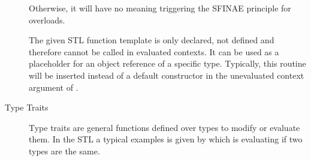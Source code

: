 \documentclass{stdlocal}
\begin{document}
\begin{description}
        Otherwise, it will have no meaning triggering the SFINAE principle for overloads.
      \item[\text{\code{std::declval}}]
        The given STL function template is only declared, not defined and therefore cannot be called in evaluated contexts.
        It can be used as a placeholder for an object reference of a specific type.
        Typically, this routine will be inserted instead of a default constructor in the unevaluated context argument of .
      \item[Type Traits]
        Type traits are general functions defined over types to modify or evaluate them.
        In the STL a typical examples is given by  which is evaluating if two types are the same.
    \end{description}
\end{document}
